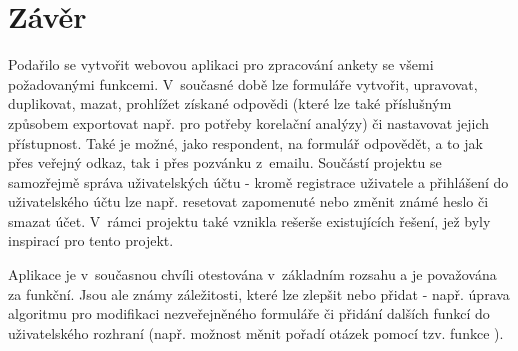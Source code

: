 \chapter{Závěr}
Podařilo se vytvořit webovou aplikaci pro zpracování ankety se všemi požadovanými funkcemi. V~současné době lze formuláře vytvořit, upravovat, duplikovat, mazat, prohlížet získané odpovědi (které lze také příslušným způsobem exportovat např. pro potřeby korelační analýzy) či nastavovat jejich přístupnost. Také je možné, jako respondent, na formulář odpovědět, a to jak přes veřejný odkaz, tak i přes pozvánku z~emailu. Součástí projektu se samozřejmě správa uživatelských účtu - kromě registrace uživatele a přihlášení do uživatelského účtu lze např. resetovat zapomenuté nebo změnit známé heslo či smazat účet. V~rámci projektu také vznikla rešerše existujících řešení, jež byly inspirací pro tento projekt.

Aplikace je v~současnou chvíli otestována v~základním rozsahu a je považována za funkční. Jsou ale známy záležitosti, které lze zlepšit nebo přidat - např. úprava algoritmu pro modifikaci nezveřejněného formuláře či přidání dalších funkcí do uživatelského rozhraní (např. možnost měnit pořadí otázek pomocí tzv. funkce ).
